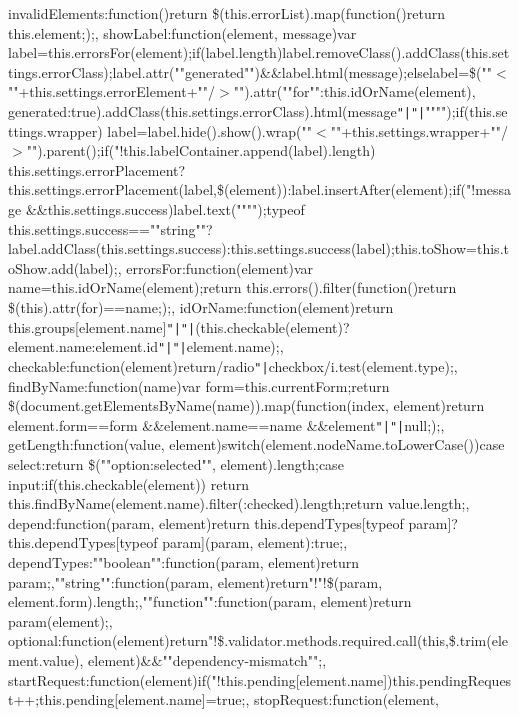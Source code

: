 invalid\+Elements\+:function()\lcurly{}return \$(this.\+error\+List).\+map(function()\lcurly{}return this.\+element;\rcurly{});\rcurly{}, show\+Label\+:function(element, message)\lcurly{}var label=this.\+errors\+For(element);if(label.\+length)\lcurly{}label.\+remove\+Class().\+add\+Class(this.\+settings.\+error\+Class);label.\+attr(""generated"")\&\&label.\+html(message);\rcurly{}else\lcurly{}label=\$(""$<$""+this.\+settings.\+error\+Element+""/$>$"").\+attr(\lcurly{}""for""\+:this.\+id\+Or\+Name(element), generated\+:true\rcurly{}).\+add\+Class(this.\+settings.\+error\+Class).\+html(message\texttt{"|}\texttt{"|}"""");if(this.\+settings.\+wrapper)\lcurly{}   label=label.\+hide().\+show().\+wrap(""$<$""+this.\+settings.\+wrapper+""/$>$"").\+parent();\rcurly{}if("!this.\+label\+Container.\+append(label).\+length) this.\+settings.\+error\+Placement?this.\+settings.\+error\+Placement(label,\$(element))\+:label.\+insert\+After(element);\rcurly{}if("!message \&\&this.\+settings.\+success)\lcurly{}label.\+text("""");typeof this.\+settings.\+success==""string""?label.\+add\+Class(this.\+settings.\+success)\+:this.\+settings.\+success(label);\rcurly{}this.\+to\+Show=this.\+to\+Show.\+add(label);\rcurly{}, errors\+For\+:function(element)\lcurly{}var name=this.\+id\+Or\+Name(element);return this.\+errors().\+filter(function()\lcurly{}return \$(this).\+attr(\textquotesingle{}for\textquotesingle{})==name;\rcurly{});\rcurly{}, id\+Or\+Name\+:function(element)\lcurly{}return this.\+groups[element.\+name]\texttt{"|}\texttt{"|}(this.\+checkable(element)?element.\+name\+:element.\+id\texttt{"|}\texttt{"|}element.\+name);\rcurly{}, checkable\+:function(element)\lcurly{}return/radio\texttt{"|}checkbox/i.\+test(element.\+type);\rcurly{}, find\+By\+Name\+:function(name)\lcurly{}var form=this.\+current\+Form;return \$(document.\+get\+Elements\+By\+Name(name)).\+map(function(index, element)\lcurly{}return element.\+form==form \&\&element.\+name==name \&\&element\texttt{"|}\texttt{"|}null;\rcurly{});\rcurly{}, get\+Length\+:function(value, element)\lcurly{}switch(element.\+node\+Name.\+to\+Lower\+Case())\lcurly{}case \textquotesingle{}select\textquotesingle{}\+:return \$(""option\+:selected"", element).\+length;case \textquotesingle{}input\textquotesingle{}\+:if(this.\+checkable(element)) return this.\+find\+By\+Name(element.\+name).\+filter(\textquotesingle{}\+:checked\textquotesingle{}).\+length;\rcurly{}return value.\+length;\rcurly{}, depend\+:function(param, element)\lcurly{}return this.\+depend\+Types[typeof param]?this.\+depend\+Types[typeof param](param, element)\+:true;\rcurly{}, depend\+Types\+:\lcurly{}""boolean""\+:function(param, element)\lcurly{}return param;\rcurly{},""string""\+:function(param, element)\lcurly{}return"!"!\$(param, element.\+form).\+length;\rcurly{},""function""\+:function(param, element)\lcurly{}return param(element);\rcurly{}\rcurly{}, optional\+:function(element)\lcurly{}return"!\$.\+validator.\+methods.\+required.\+call(this,\$.\+trim(element.\+value), element)\&\&""dependency-\/mismatch"";\rcurly{}, start\+Request\+:function(element)\lcurly{}if("!this.\+pending[element.\+name])\lcurly{}this.\+pending\+Request++;this.\+pending[element.\+name]=true;\rcurly{}\rcurly{}, stop\+Request\+:function(element, 